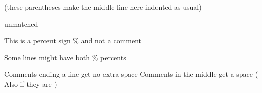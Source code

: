 \documentclass{article}
\begin{document}
(these parentheses
  make the middle line here
indented as usual)


unmatched %

This is a percent sign \% and not a comment

Some lines might have both \% percents %

Comments ending a line get no extra space%
Comments in the middle get a space%
(
  Also if they are
)
\end{document}
